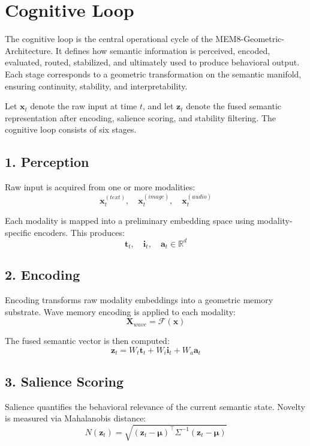 \section{Cognitive Loop}

The cognitive loop is the central operational cycle of the
MEM8-Geometric-Architecture. It defines how semantic information is perceived,
encoded, evaluated, routed, stabilized, and ultimately used to produce
behavioral output. Each stage corresponds to a geometric transformation on the
semantic manifold, ensuring continuity, stability, and interpretability.

Let $\mathbf{x}_t$ denote the raw input at time $t$, and let
$\mathbf{z}_t$ denote the fused semantic representation after encoding,
salience scoring, and stability filtering. The cognitive loop consists of six
stages.

\subsection{1. Perception}

Raw input is acquired from one or more modalities:
\[
\mathbf{x}_t^{(text)},\quad
\mathbf{x}_t^{(image)},\quad
\mathbf{x}_t^{(audio)}
\]

Each modality is mapped into a preliminary embedding space using
modality-specific encoders. This produces:
\[
\mathbf{t}_t,\quad \mathbf{i}_t,\quad \mathbf{a}_t \in \mathbb{R}^d
\]

\subsection{2. Encoding}

Encoding transforms raw modality embeddings into a geometric memory substrate.
Wave memory encoding is applied to each modality:
\[
\mathbf{X}_{wave} = \mathcal{F}(\mathbf{x})
\]

The fused semantic vector is then computed:
\[
\mathbf{z}_t = W_t \mathbf{t}_t + W_i \mathbf{i}_t + W_a \mathbf{a}_t
\]

\subsection{3. Salience Scoring}

Salience quantifies the behavioral relevance of the current semantic state.
Novelty is measured via Mahalanobis distance:
\[
N(\mathbf{z}_t) =
\sqrt{(\mathbf{z}_t - \bm{\mu})^\top \Sigma^{-1}
(\mathbf{z}_t - \bm{\mu})}
\]

